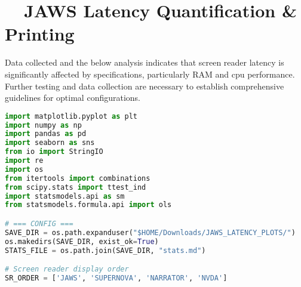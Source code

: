 \section{~~JAWS Latency Quantification \& Printing}
Data collected and the below analysis indicates that screen reader latency is significantly affected by  specifications, particularly RAM and \gls{cpu} performance. Further testing and data collection are necessary to establish comprehensive guidelines for optimal configurations.

\begin{lstlisting}[language=Python]
import matplotlib.pyplot as plt
import numpy as np
import pandas as pd
import seaborn as sns
from io import StringIO
import re
import os
from itertools import combinations
from scipy.stats import ttest_ind
import statsmodels.api as sm
from statsmodels.formula.api import ols

# === CONFIG ===
SAVE_DIR = os.path.expanduser("$HOME/Downloads/JAWS_LATENCY_PLOTS/")
os.makedirs(SAVE_DIR, exist_ok=True)
STATS_FILE = os.path.join(SAVE_DIR, "stats.md")

# Screen reader display order
SR_ORDER = ['JAWS', 'SUPERNOVA', 'NARRATOR', 'NVDA']


\end{lstlisting}
